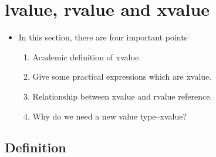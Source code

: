 \documentclass[a4paper,11pt,twoside]{book}
\begin{document}
\section{lvalue, rvalue and xvalue}
\begin{itemize}
	\item In this section, there are four important points
	\begin{enumerate}
		\item Academic definition of xvalue.
		\item Give some practical expressions which are xvalue.
		\item Relationship between xvalue and rvalue reference.
		\item Why do we need a new value type--xvalue?
	\end{enumerate}
	
\end{itemize}

\subsection{Definition}
\end{document}
